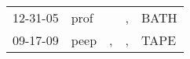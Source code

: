 \begin{supertabular}{p{0.07\textwidth}p{0.06\textwidth}p{0.02\textwidth}p{0.02\textwidth}p{0.06\textwidth}}
 12-31-05\textsuperscript{} &  prof\textsuperscript{} &    &  , &  BATH\textsuperscript{} \\
 09-17-09\textsuperscript{} &  peep\textsuperscript{} &  , &  , &  TAPE\textsuperscript{} \\
\end{supertabular}
